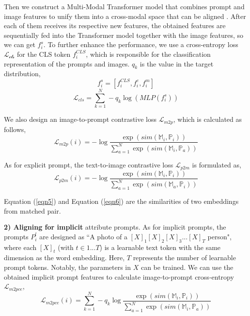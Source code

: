 \documentclass[letterpaper]{article} %
\begin{document}
Then we construct a Multi-Modal Transformer model that combines prompt and image features to unify them into a cross-modal space that can be aligned \cite{luo2019bag}. After each of them receives its respective new features, the obtained features are sequentially fed into the Transformer model together with the image features, so we can get ${f}_{i}^{s}$. To further enhance the performance, we use a cross-entropy loss $\mathcal{L_{\text {cls}}}$ for the CLS token ${f}_{i}^{CLS}$, which is responsible for the classification representation of the prompts and images. $q_k$ is the value in the target distribution,
\begin{equation}
{f}_{i}^{s}=[{f}_{i}^{CLS},{f}_{i}^{e},{f}_{i}^{m}]
\end{equation}
\begin{equation}\label{eqn8}
\mathcal{L}_{cls}={\sum_{k=1}^N -q_{k}\log (MLP({f}^{s}_{i}))}
\end{equation}

We also design an image-to-prompt contrastive loss $\mathcal{L}_{m2p}$, which is calculated as follows,
\begin{equation}\label{eqn5}
\mathcal{L}_{m 2 p}(i)=-\log \frac{\exp \left(sim\left(\mathbb{M}_i, \mathbb{P}_i\right)\right)}{\sum_{a=1}^N \exp \left(sim\left(\mathbb{M}_i, \mathbb{P}_a\right)\right)}
\end{equation}

As for explicit prompt, the text-to-image contrastive loss $\mathcal{L}_{{p 2 m}}$ is formulated as,
\begin{equation}\label{eqn6}
\mathcal{L}_{{p 2 m}}(i)=-\log \frac{\exp \left(sim\left(\mathbb{M}_i, \mathbb{P}_i\right)\right)}{\sum_{a=1}^N \exp \left(sim\left(\mathbb{M}_a, \mathbb{P}_i\right)\right)}
\end{equation}

Equation (\ref{eqn5}) and Equation (\ref{eqn6}) are the similarities of two embeddings from matched pair.

\textbf{2) Aligning for implicit} attribute prompts. As for implicit prompts, the prompts $P_{i}^{l}$ are designed as ``A photo of a $[X]_{1}[X]_{2}[X]_{3}...[X]_{T}$ person", where each $[X]_{t}$ (with $t \in {1...T}$) is a learnable text token with the same dimension as the word embedding. Here, $T$ represents the number of learnable prompt tokens. Notably, the parameters in $X$ can be trained. We can use the obtained implicit prompt features to calculate image-to-prompt cross-entropy $\mathcal{L}_{m2pce}$,
\begin{equation}\label{eqn7}
\mathcal{L}_{m 2 p c e}(i)=\sum_{k=1}^N-q_k \log \frac{\exp \left(sim\left(\mathbb{M}_i, \mathbb{P}_i \right)\right)}{\sum_{a=1}^N \exp \left(sim\left(\mathbb{M}_i, \mathbb{P}_a\right)\right)}
\end{equation}
\end{document}
